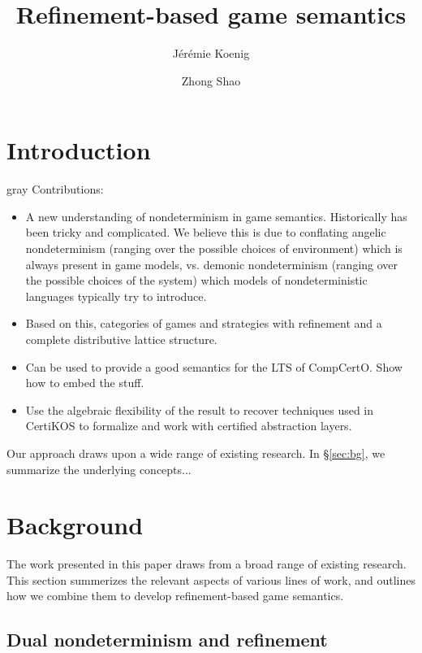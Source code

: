 \documentclass[format=sigplan,authordraft]{acmart}
\title{Refinement-based game semantics} %
\author{J\'er\'emie Koenig}
\affiliation{Yale University}
\author{Zhong Shao}
\affiliation{Yale University}
\begin{document}
\maketitle

\section{Introduction} %

\begin{color}{gray}
Contributions:
\begin{itemize}
\item A new understanding of nondeterminism in game semantics.
  Historically has been tricky and complicated.
  We believe this is due to conflating
  angelic nondeterminism
  (ranging over the possible choices of environment)
  which is always present in game models,
  vs. demonic nondeterminism
  (ranging over the possible choices of the system)
  which models of nondeterministic languages
  typically try to introduce.
\item Based on this,
  categories of games and strategies
  with refinement and a complete distributive lattice structure.
\item Can be used to provide a good semantics
  for the LTS of CompCertO.
  Show how to embed the stuff.
\item Use the algebraic flexibility of the result
  to recover techniques used in CertiKOS
  to formalize and work with
  certified abstraction layers.
\end{itemize}
\end{color}

Our approach draws upon a wide range of existing research.
In \S\ref{sec:bg},
we summarize the underlying concepts...


\section{Background} %


The work presented in this paper
draws from a broad range of existing research.
This section summerizes the relevant aspects
of various lines of work,
and outlines how we combine them
to develop
refinement-based game semantics.


\subsection{Dual nondeterminism and refinement} \label{sec:refcal} %
\end{document}
